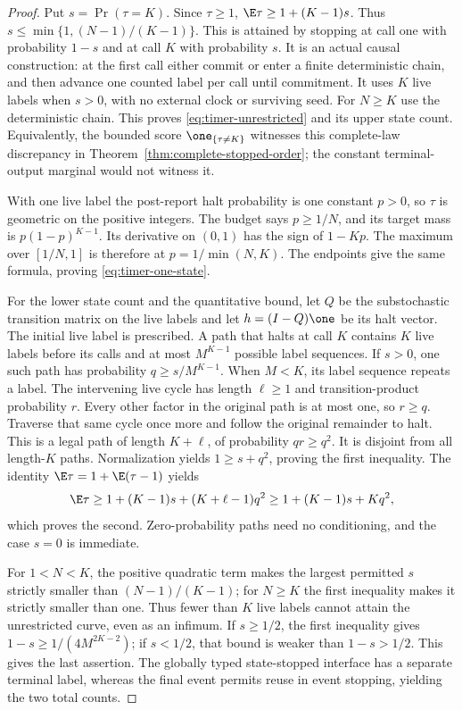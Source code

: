 \begin{proof}
Put $s=\Pr(\tau=K)$. Since $\tau\ge1$,
$\E\tau\ge1+(K-1)s$. Thus $s\le\min\{1,(N-1)/(K-1)\}$. This is attained by stopping at call one with probability $1-s$ and at call $K$ with probability $s$. It is an actual causal construction: at the first call either commit or enter a finite deterministic chain, and then advance one counted label per call until commitment. It uses $K$ live labels when $s>0$, with no external clock or surviving seed. For $N\ge K$ use the deterministic chain. This proves \eqref{eq:timer-unrestricted} and its upper state count. Equivalently, the bounded score $\one_{\{\tau\ne K\}}$ witnesses this complete-law discrepancy in Theorem~\ref{thm:complete-stopped-order}; the constant terminal-output marginal would not witness it.

With one live label the post-report halt probability is one constant $p>0$, so $\tau$ is geometric on the positive integers. The budget says $p\ge1/N$, and its target mass is $p(1-p)^{K-1}$. Its derivative on $(0,1)$ has the sign of $1-Kp$. The maximum over $[1/N,1]$ is therefore at $p=1/\min(N,K)$. The endpoints give the same formula, proving \eqref{eq:timer-one-state}.

For the lower state count and the quantitative bound, let $Q$ be the substochastic transition matrix on the live labels and let $h=(I-Q)\one$ be its halt vector. The initial live label is prescribed. A path that halts at call $K$ contains $K$ live labels before its calls and at most $M^{K-1}$ possible label sequences. If $s>0$, one such path has probability $q\ge s/M^{K-1}$. When $M<K$, its label sequence repeats a label. The intervening live cycle has length $\ell\ge1$ and transition-product probability $r$. Every other factor in the original path is at most one, so $r\ge q$. Traverse that same cycle once more and follow the original remainder to halt. This is a legal path of length $K+\ell$, of probability $qr\ge q^2$. It is disjoint from all length-$K$ paths. Normalization yields $1\ge s+q^2$, proving the first inequality. The identity $\E\tau=1+\E(\tau-1)$ yields
\[
 \E\tau\ge1+(K-1)s+(K+\ell-1)q^2
          \ge1+(K-1)s+Kq^2,
\]
which proves the second. Zero-probability paths need no conditioning, and the case $s=0$ is immediate.

For $1<N<K$, the positive quadratic term makes the largest permitted $s$ strictly smaller than $(N-1)/(K-1)$; for $N\ge K$ the first inequality makes it strictly smaller than one. Thus fewer than $K$ live labels cannot attain the unrestricted curve, even as an infimum. If $s\ge1/2$, the first inequality gives $1-s\ge1/(4M^{2K-2})$; if $s<1/2$, that bound is weaker than $1-s>1/2$. This gives the last assertion. The globally typed state-stopped interface has a separate terminal label, whereas the final event permits reuse in event stopping, yielding the two total counts.
\end{proof}

